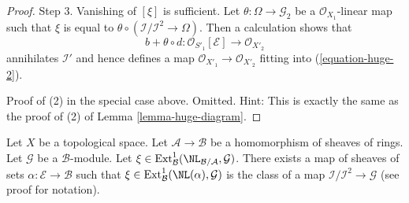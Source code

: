 \begin{proof}
\medskip\noindent
Step 3. Vanishing of $[\xi]$ is sufficient. Let
$\theta : \Omega \to \mathcal{G}_2$ be a $\mathcal{O}_{X_1}$-linear map
such that $\xi$ is equal to
$\theta \circ (\mathcal{I}/\mathcal{I}^2 \to \Omega)$.
Then a calculation shows that
$$
b + \theta \circ d : \mathcal{O}_{S'_1}[\mathcal{E}] \to \mathcal{O}_{X'_2}
$$
annihilates $\mathcal{I}'$ and hence defines a map
$\mathcal{O}_{X'_1} \to \mathcal{O}_{X'_2}$ fitting into
(\ref{equation-huge-2}).

\medskip\noindent
Proof of (2) in the special case above. Omitted. Hint:
This is exactly the same as the proof of (2) of Lemma \ref{lemma-huge-diagram}.
\end{proof}

\begin{lemma}
\label{lemma-NL-represent-ext-class}
Let $X$ be a topological space. Let $\mathcal{A} \to \mathcal{B}$ be a
homomorphism of sheaves of rings. Let $\mathcal{G}$ be a $\mathcal{B}$-module.
Let
$\xi \in \text{Ext}^1_\mathcal{B}(\NL_{\mathcal{B}/\mathcal{A}}, \mathcal{G})$. 
There exists a map of sheaves of sets $\alpha : \mathcal{E} \to \mathcal{B}$
such that $\xi \in \text{Ext}^1_\mathcal{B}(\NL(\alpha), \mathcal{G})$
is the class of a map $\mathcal{I}/\mathcal{I}^2 \to \mathcal{G}$
(see proof for notation).
\end{lemma}

